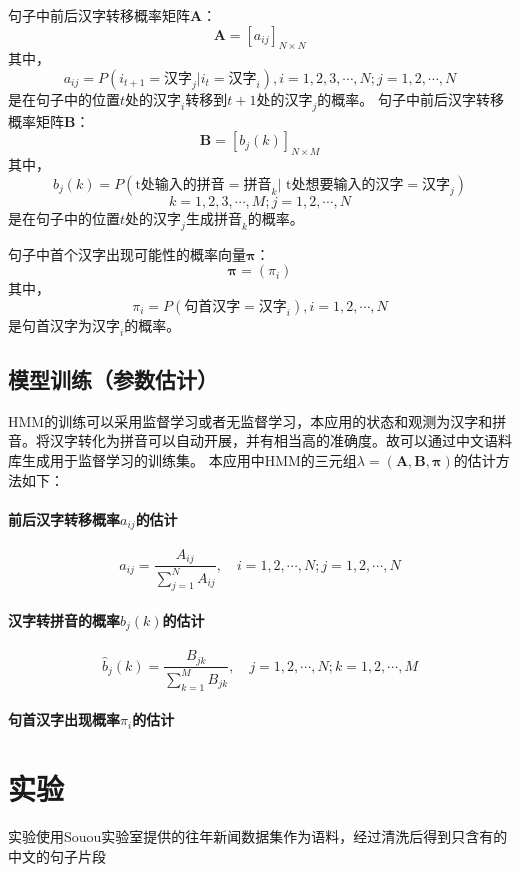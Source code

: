 \documentclass[12pt,a4paper,draft]{ctexart}
\begin{document}
句子中前后汉字转移概率矩阵$\bm{A}$：
\[ \bm{A}=[a_{ij}]_{N\times N} \]
其中，
\[ a_{ij}=P(i_{t+1}=\mbox{汉字}_j|i_t=\mbox{汉字}_i),  i=1,2,3,\cdots,N; j=1,2,\cdots,N\]
是在句子中的位置$ t $处的$ \mbox{汉字}_i $转移到$ t+1 $处的$ \mbox{汉字}_j $的概率。
句子中前后汉字转移概率矩阵$\bm{B}$：
\[ \bm{B}=[b_j(k)]_{N\times M} \]
其中，
\[ b_j(k)=P(\mbox{t处输入的拼音}=\mbox{拼音}_k|\mbox{ t处想要输入的汉字}=\mbox{汉字}_j) \]
\[ k=1,2,3,\cdots,M; j=1,2,\cdots,N\]
是在句子中的位置$ t $处的$ \mbox{汉字}_j $生成$ \mbox{拼音}_k $的概率。

句子中首个汉字出现可能性的概率向量$\bm{\pi}$：
\[ \bm{\pi}=(\pi_i) \]
其中，
\[ \pi_i=P(\mbox{句首汉字}=\mbox{汉字}_i), i=1,2,\cdots,N \]
是句首汉字为$\mbox{汉字}_i$的概率。
\subsection{模型训练（参数估计）}
HMM的训练可以采用监督学习或者无监督学习\cite{李航统计学习}，本应用的状态和观测为汉字和拼音。将汉字转化为拼音可以自动开展，并有相当高的准确度\cite{accuracy-of-auto-pinyin}。故可以通过中文语料库生成用于监督学习的训练集。
本应用中HMM的三元组$ \lambda=(\bm{A},\bm{B},\bm{\pi}) $的估计方法如下：
\paragraph{前后汉字转移概率$a_{ij}$的估计}
\[ \hat{a}_{i j}=\frac{A_{ij}}{\sum_{j=1}^{N} A_{i j}}, \quad i=1,2, \cdots, N ; j=1,2, \cdots, N \]
\paragraph{汉字转拼音的概率$b_j(k)$的估计}
\[ \hat{b}_{j}(k)=\frac{B_{j k}}{\sum_{k=1}^{M} B_{j k}}, \quad j=1,2, \cdots, N ; k=1,2, \cdots, M \]
\paragraph{句首汉字出现概率$\pi_i$的估计}


\section{实验}
实验使用Souou实验室提供的往年新闻数据集作为语料，经过清洗后得到只含有的中文的句子片段\cite{viterbi2006a}
\printbibliography[heading=bibliography,title=参考文献]
\end{document}
